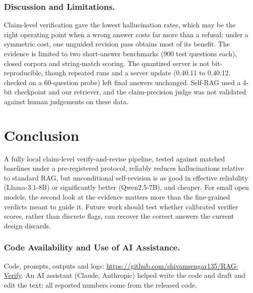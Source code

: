\documentclass{svproc}
\begin{document}
\subsubsection{Discussion and Limitations.} Claim-level verification gave the lowest hallucination rates, which may be the right operating point when a wrong answer costs far more than a refusal; under a symmetric cost, one unguided revision pass obtains most of its benefit. The evidence is limited to two short-answer benchmarks (900 test questions each), closed corpora and string-match scoring. The quantized server is not bit-reproducible, though repeated runs and a server update (0.40.11 to 0.40.12, checked on a 60-question probe) left final answers unchanged. Self-RAG used a 4-bit checkpoint and our retriever, and the claim-precision judge was not validated against human judgements on these data.

\section{Conclusion}
A fully local claim-level verify-and-revise pipeline, tested against matched baselines under a pre-registered protocol, reliably reduces hallucinations relative to standard RAG, but unconditional self-revision is as good in effective reliability (Llama-3.1-8B) or significantly better (Qwen2.5-7B), and cheaper. For small open models, the second look at the evidence matters more than the fine-grained verdicts meant to guide it. Future work should test whether calibrated verifier scores, rather than discrete flags, can recover the correct answers the current design discards.

\subsubsection*{Code Availability and Use of AI Assistance.} Code, prompts, outputs and logs: \url{https://github.com/shivamsengar135/RAG-Verify}. An AI assistant (Claude, Anthropic) helped write the code and draft and edit the text; all reported numbers come from the released code.



\end{document}
